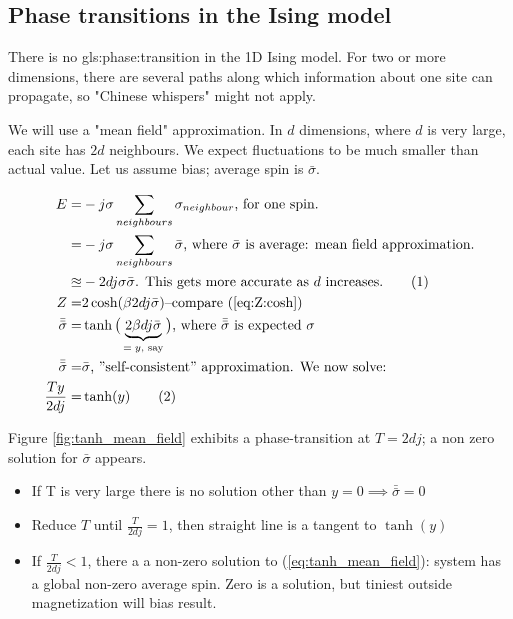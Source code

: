 \documentclass[]{article}
\newcommand\numberthis{\addtocounter{equation}{1}\tag{\theequation}}
\begin{document}
\subsection{Phase transitions in the Ising model}

There is no \gls{gls:phase:transition} in the 1D Ising model. For two or more dimensions, there are several paths along which information about one site can propagate, so "Chinese whispers" might not apply.

We will use a "mean field" approximation. In $d$ dimensions, where $d$ is very large, each site has $2d$ neighbours. We expect fluctuations to be much smaller than actual value. Let us assume bias; average spin is $\bar{\sigma}$.

\begin{align*}
E =& -j \sigma \sum_{neighbours} \sigma_{neighbour} \text{, for one spin.}\\
=& -j \sigma \sum_{neighbours} \bar{\sigma}\text{, where $\bar{\sigma}$ is average: mean field approximation.}\\
\approxeq &-2 d j \sigma \bar{\sigma}\text{. This gets more accurate as $d$ increases.} \numberthis \label{eq:E:sigma}\\
Z =& 2 \cosh(\beta 2 d j \bar{\sigma}) \text{--compare (\ref{eq:Z:cosh})}\\
\bar{\bar{\sigma}} =& \tanh\big(\underbrace{2 \beta d j  \bar{\sigma}}_\text{$=y$, say}\big) \text{, where $\bar{\bar{\sigma}}$ is expected $\sigma$} \\
\bar{\bar{\sigma}} =& \bar{\sigma} \text{, ''self-consistent'' approximation. We now solve:}\\
\frac{T y}{2 d j} =& \tanh(y)\numberthis \label{eq:tanh_mean_field}
\end{align*}  

Figure \ref{fig:tanh_mean_field} exhibits a phase-transition at $T=2dj$; a non zero solution for $\bar{\sigma}$ appears.
\begin{itemize}
	\item If T is very large there is no solution other than $y=0\implies\bar{\bar{\sigma}}=0$
	\item Reduce $T$ until $\frac{T}{2 d j}= 1$, then straight line is a tangent to $\tanh(y)$
	\item If $\frac{T}{2 d j}< 1$, there a a non-zero solution to (\ref{eq:tanh_mean_field}): system has a global non-zero average spin. Zero is a solution, but tiniest outside magnetization will bias result.
\end{itemize}
\end{document}
